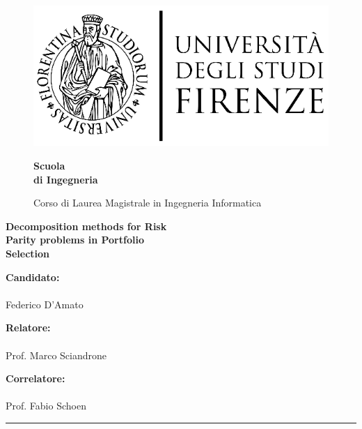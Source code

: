 \begin{figure}[htbp]
\begin{minipage}{0.3\textwidth}
\centering
\includegraphics[scale=0.8]{logo_universita.eps}
\end{minipage}
\hspace{0.3\textwidth}
\begin{minipage}{0.4\textwidth}
\centering
\begin{flushright}
{\Large \textbf{Scuola\\
 di Ingegneria \\}
}
\end{flushright}
\begin{flushright}
Corso di Laurea Magistrale in Ingegneria Informatica
\end{flushright}
\end{minipage}

\end{figure}


\vspace{35mm}
\begin{center}

 {\huge {\bf Decomposition methods for Risk}}\\
 \vspace{2mm}
 {\huge{\bf Parity problems in Portfolio}}\\
 \vspace{2mm}
 {\huge{\bf Selection}}\\

\end{center}
\vspace{30mm}

{\Large \textbf{Candidato:}}\\
\vspace{-2.5mm}\\
{\LARGE Federico D'Amato\\}

{\Large \textbf{Relatore:}}\\
\vspace{-2.5mm}\\
{\LARGE Prof. Marco Sciandrone\\}

{\Large \textbf{Correlatore:}}\\
\vspace{-2.5mm}\\
{\LARGE Prof. Fabio Schoen}


\vfill
\begin{center}
\rule{0.7\textwidth}{.4pt}
\end{center}
\vspace{-4mm}
